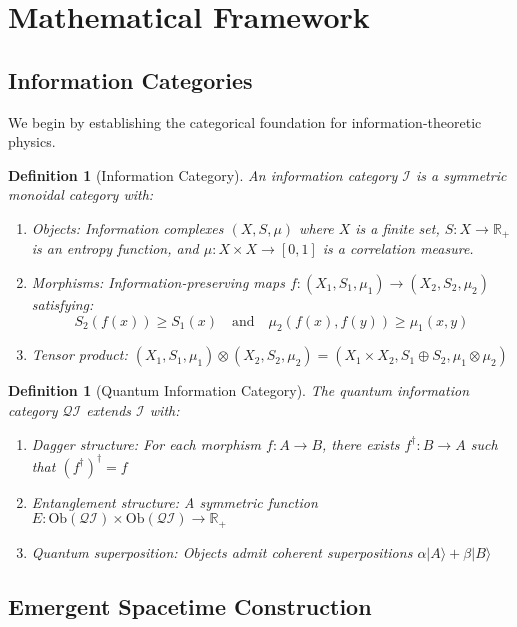\documentclass{article}
\newtheorem{definition}[theorem]{Definition}
\begin{document}
\section{Mathematical Framework}

\subsection{Information Categories}

We begin by establishing the categorical foundation for information-theoretic physics.

\begin{definition}[Information Category]
An \emph{information category} $\mathcal{I}$ is a symmetric monoidal category with:
\begin{enumerate}
\item Objects: Information complexes $(X, S, \mu)$ where $X$ is a finite set, $S: X \to \mathbb{R}_+$ is an entropy function, and $\mu: X \times X \to [0,1]$ is a correlation measure.
\item Morphisms: Information-preserving maps $f: (X_1, S_1, \mu_1) \to (X_2, S_2, \mu_2)$ satisfying:
\begin{equation}
S_2(f(x)) \geq S_1(x) \quad \text{and} \quad \mu_2(f(x), f(y)) \geq \mu_1(x, y)
\end{equation}
\item Tensor product: $(X_1, S_1, \mu_1) \otimes (X_2, S_2, \mu_2) = (X_1 \times X_2, S_1 \oplus S_2, \mu_1 \otimes \mu_2)$
\end{enumerate}
\end{definition}

\begin{definition}[Quantum Information Category]
The quantum information category $\mathcal{Q}\mathcal{I}$ extends $\mathcal{I}$ with:
\begin{enumerate}
\item Dagger structure: For each morphism $f: A \to B$, there exists $f^\dagger: B \to A$ such that $(f^\dagger)^\dagger = f$
\item Entanglement structure: A symmetric function $E: \text{Ob}(\mathcal{Q}\mathcal{I}) \times \text{Ob}(\mathcal{Q}\mathcal{I}) \to \mathbb{R}_+$
\item Quantum superposition: Objects admit coherent superpositions $\alpha |A\rangle + \beta |B\rangle$
\end{enumerate}
\end{definition}

\subsection{Emergent Spacetime Construction}
\end{document}
